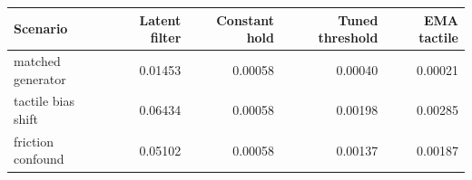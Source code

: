 \begin{tabular}{lrrrr}
\toprule
Scenario & Latent filter & Constant hold & Tuned threshold & EMA tactile \\
\midrule
matched generator & 0.01453 & 0.00058 & 0.00040 & 0.00021 \\
tactile bias shift & 0.06434 & 0.00058 & 0.00198 & 0.00285 \\
friction confound & 0.05102 & 0.00058 & 0.00137 & 0.00187 \\
\bottomrule
\end{tabular}
